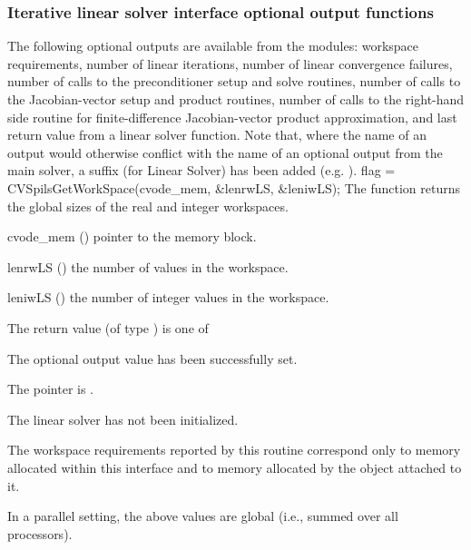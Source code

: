 \subsubsection{Iterative linear solver interface optional output functions}
\label{sss:optout_spils}
The following optional outputs are available from the {\cvspils}
modules: workspace requirements, number of linear iterations, number of
linear convergence failures, number of calls to the preconditioner
setup and solve routines, number of calls to the Jacobian-vector
setup and product routines, number of calls to the right-hand side
routine for finite-difference Jacobian-vector product approximation,
and last return value from a linear solver function.
Note that, where the name of an output would otherwise conflict with
the name of an optional output from the main solver, a suffix 
(for Linear Solver) has been added (e.g.  ).
{
  flag = CVSpilsGetWorkSpace(cvode\_mem, \&lenrwLS, \&leniwLS);
}
{
  The function  returns the global sizes of the
  {\cvspils} real and integer workspaces.
}
{
  \begin{args}
  \item[cvode\_mem] ()
    pointer to the {\cvode} memory block.
  \item[lenrwLS] ()
    the number of  values in the {\cvspils} workspace.
  \item[leniwLS] ()
    the number of integer values in the {\cvspils} workspace.
  \end{args}
}
{
  The return value  (of type ) is one of
  \begin{args}
  \item[\Id{CVSPILS\_SUCCESS}]
    The optional output value has been successfully set.
  \item[\Id{CVSPILS\_MEM\_NULL}]
    The  pointer is .
  \item[\Id{CVSPILS\_LMEM\_NULL}]
    The {\cvspils} linear solver has not been initialized.
  \end{args}
}
{
  The workspace requirements reported by this routine correspond only
  to memory allocated within this interface and to memory allocated by
  the {\sunlinsol} object attached to it.

  In a parallel setting, the above values are global (i.e., summed over all
  processors).
}
